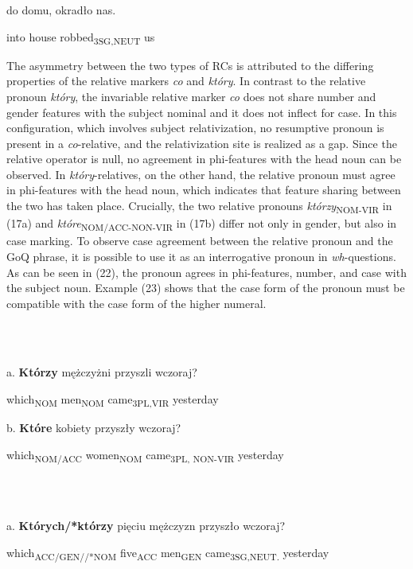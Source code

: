\documentclass[output=paper]{langsci/langscibook}
\begin{document}
\textsubscript{} do   domu,   okradło     nas.

    into   house     robbed\textsubscript{3SG,NEUT} us 

The asymmetry between the two types of RCs is attributed to the differing properties of the relative markers \textit{co} and \textit{który}. In contrast to the relative pronoun \textit{który}, the invariable relative marker \textit{co} does not share number and gender features with the subject nominal and it does not inflect for case. In this configuration, which involves subject relativization, no resumptive pronoun is present in a \textit{co}{}-relative, and the relativization site is realized as a gap. Since the relative operator is null, no agreement in phi-features with the head noun can be observed. In \textit{który}{}-relatives, on the other hand, the relative pronoun must agree in phi-features with the head noun, which indicates that feature sharing between the two has taken place. Crucially, the two relative pronouns \textit{którzy}\textsubscript{NOM-VIR} in (17a) and \textit{które}\textsubscript{NOM/ACC-NON-VIR} in (17b) differ not only in gender, but also in case marking. To observe case agreement between the relative pronoun and the GoQ phrase, it is possible to use it as an interrogative pronoun in \textit{wh}{}-questions. As can be seen in (22), the pronoun agrees in phi-features, number, and case with the subject noun. Example (23) shows that the case form of the pronoun must be compatible with the case form of the higher numeral.

\ea%
    \label{ex:key:22}
    \gll\\
        \\
    \glt
    \z

          a.   \textbf{Którzy}   mężczyżni   przyszli   wczoraj?

    which\textsubscript{NOM}   men\textsubscript{NOM}  came\textsubscript{3PL,VIR} yesterday

  b.   \textbf{Które}   kobiety   przyszły     wczoraj?

    which\textsubscript{NOM/ACC} women\textsubscript{NOM}   came\textsubscript{3PL, NON-VIR} yesterday

\ea%
    \label{ex:key:23}
    \gll\\
        \\
    \glt
    \z

          a.   \textbf{Których/*którzy}   pięciu   mężczyzn   przyszło    wczoraj?

    which\textsubscript{ACC/GEN//*NOM} five\textsubscript{ACC} men\textsubscript{GEN}  came\textsubscript{3SG,NEUT.} yesterday
\end{document}
